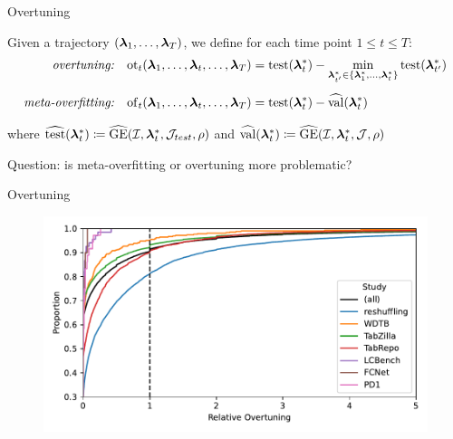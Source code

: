 \documentclass[11pt,compress,t,notes=noshow, xcolor=table]{beamer}
\begin{document}
\begin{frame}{Overtuning}

\vfill

\begin{definition}
Given a trajectory $(\bm{\lambda}_{1}, \ldots, \bm{\lambda}_{T})$, we define for each time point $1 \leq t \leq T$:
\begin{align}
%
\text{\emph{overtuning:}} \quad
\mathrm{ot}_{t}(\lamv_{1}, \ldots, \lamv_{t}, \ldots, \lamv_{T})
&= \mathrm{test}(\lams_{t}) 
- \min_{\lams_{t^\prime} \in \{\lams_{1}, \ldots, \lams_{t}\}} \mathrm{test}(\lams_{t^\prime}) \label{eq:overtuning} \\[1ex]
%
\text{\emph{meta-overfitting:}} \quad
\mathrm{of}_{t}(\lamv_{1}, \ldots, \lamv_{t}, \ldots, \lamv_{T})
&= \mathrm{test}(\lams_{t}) - \widehat{\mathrm{val}}(\lams_{t}) \label{eq:meta-overfitting} \\[1ex]
%
\end{align}
where $\widehat{\mathrm{test}}(\bm{\lambda}^{*}_{t}) \coloneqq \widehat{\mathrm{GE}}(\mathcal{I}, \bm{\lambda}^{*}_t, \mathcal{J}_{test}, \rho)$ and $\widehat{\mathrm{val}}(\bm{\lambda}^{*}_{t}) \coloneqq \widehat{\mathrm{GE}}(\mathcal{I}, \bm{\lambda}^{*}_t, \mathcal{J}, \rho)$
\end{definition}

\vfill

Question: is meta-overfitting or overtuning more problematic?

\vfill

\end{frame}

\begin{frame}{Overtuning}
\vfill
    \begin{figure}
        \centering
        \includegraphics[width=0.9\linewidth]{figure_man/ecdf_all.pdf}
    \end{figure}
\vfill
\end{frame}
\end{document}
